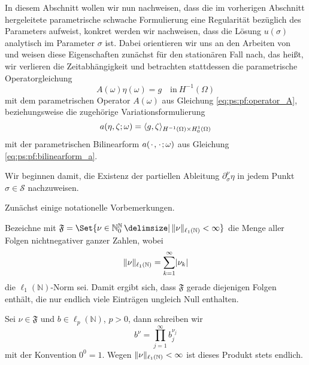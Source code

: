 In diesem Abschnitt wollen wir nun nachweisen, dass die im vorherigen Abschnitt hergeleitete parametrische schwache Formulierung eine Regularität bezüglich des Parameters aufweist, konkret werden wir nachweisen, dass die Lösung $u(\sigma)$ analytisch im Parameter $\sigma$ ist.
Dabei orientieren wir uns an den Arbeiten von \textcite{Cohen:2010kz,Kunoth:2013ef} und weisen diese Eigenschaften zunächst für den stationären Fall nach, das heißt, wir verlieren die Zeitabhängigkeit und betrachten stattdessen die parametrische Operatorgleichung
\begin{equation}
\label{eq:ps:rg:operatorgleichung_parametrisch}
    A(\omega) \eta(\omega) = g \quad \text{in}~H^{-1}(\Omega)
\end{equation}
mit dem parametrischen Operator $A(\omega)$ aus Gleichung \cref{eq:ps:pf:operator_A}, beziehungsweise die zugehörige Variationsformulierung
\begin{equation}
\label{eq:ps:rg:variationsformulierung_parametrisch}
    a(\eta, \zeta; \omega) = \langle g,\zeta\rangle_{H^{-1}(\Omega) \times H^{1}_{0}(\Omega)}
\end{equation}
mit der parametrischen Bilinearform $a({\mkern2mu\cdot\mkern2mu}, {\mkern2mu\cdot\mkern2mu}; \omega)$ aus Gleichung \cref{eq:ps:pf:bilinearform_a}.

Wir beginnen damit, die Existenz der partiellen Ableitung $\partial^{\nu}_{\sigma} \eta$ in jedem Punkt $\sigma \in \mathcal S$ nachzuweisen.

Zunächst einige notationelle Vorbemerkungen.
\begin{Bemerkung}
    Bezeichne mit $\mathfrak F = \Set{ \nu \in \mathbb{N}^{\mathbb{N}}_{0} \given \norm{\nu}_{\ell_{1}(\mathbb{N})} < \infty }$ die Menge aller Folgen nichtnegativer ganzer Zahlen, wobei
    \begin{equation}
        \lVert\nu\rVert_{\ell_{1}(\mathbb{N})} = \sum_{k = 1}^{\infty} \lvert\nu_{k}\rvert
    \end{equation}
    die $\ell_{1}(\mathbb{N})$-Norm sei.
    Damit ergibt sich, dass $\mathfrak F$ gerade diejenigen Folgen enthält, die nur endlich viele Einträgen ungleich Null enthalten.

    Sei $\nu \in \mathfrak F$ und $b \in \ell_{p}(\mathbb{N})$, $p > 0$, dann schreiben wir
    \begin{equation}
        b^{\nu} = \prod_{j = 1}^{\infty} b_{j}^{\nu_{j}}
    \end{equation}
    mit der Konvention $0^{0} = 1$.
    Wegen $\lVert\nu\rVert_{\ell_{1}(\mathbb{N})} < \infty$ ist dieses Produkt stets endlich.
\end{Bemerkung}

